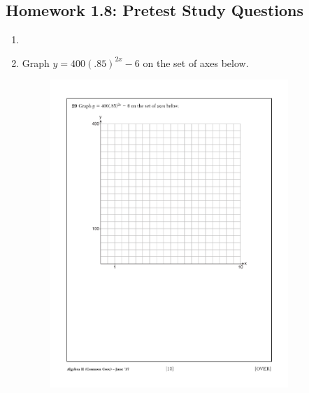 \documentclass[12pt, oneside]{article}
\begin{document}
\subsection*{Homework 1.8: Pretest Study Questions}
\begin{enumerate}
  \item
  \newpage %
  \item  %
  Graph $y =400(.85)^{2x} -6$ on the set of axes below.

  \begin{figure}[!ht]
      \centering
      \includegraphics[width=0.85\textwidth]{1stQ-grid-special.pdf}
  \end{figure}


\end{enumerate}
\end{document}
